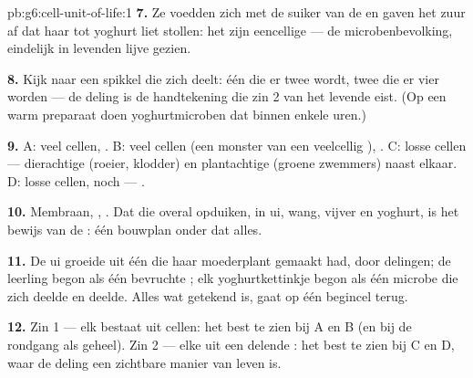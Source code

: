\begin{solution}{pb:g6:cell-unit-of-life:1}
\textbf{7.} Ze voedden zich met de suiker van de  en gaven het zuur af
dat haar tot yoghurt liet stollen: het zijn eencellige  ---
de microbenbevolking, eindelijk in levenden lijve gezien.

\textbf{8.} Kijk naar een spikkel die zich deelt: één die er twee wordt,
twee die er vier worden --- de deling is de handtekening die zin 2 van
het levende eist. (Op een warm preparaat doen yoghurtmicroben dat binnen
enkele uren.)

\textbf{9.} A: veel cellen, . B: veel cellen (een monster van een
veelcellig ), . C: losse cellen --- dierachtige (roeier, klodder)
en plantachtige (groene zwemmers) naast elkaar. D: losse cellen, 
noch  --- .

\textbf{10.} Membraan, , . Dat die overal opduiken, in
ui, wang, vijver en yoghurt, is het bewijs van de :
één bouwplan onder dat alles.

\textbf{11.} De ui groeide uit één  die haar moederplant gemaakt had,
door delingen; de leerling begon als één bevruchte ; elk
yoghurtkettinkje begon als één microbe die zich deelde en deelde. Alles
wat getekend is, gaat op één begincel terug.

\textbf{12.} Zin 1 --- elk  bestaat uit cellen: het best te
zien bij A en B (en bij de rondgang als geheel). Zin 2 --- elke  uit
een delende : het best te zien bij C en D, waar de deling een
zichtbare manier van leven is.
\end{solution}
